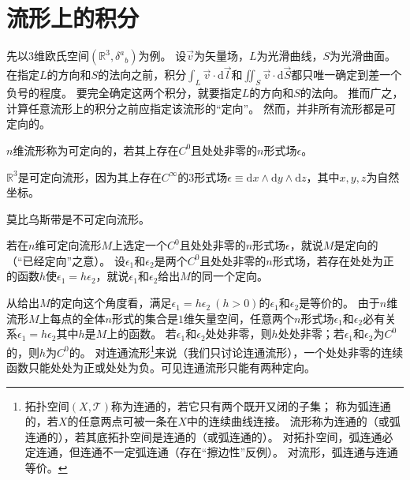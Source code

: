 \section{流形上的积分}

先以$3$维欧氏空间$(\mathbb{R}^3, \delta^a{}_{b})$为例。
设$\vec{v}$为矢量场，$L$为光滑曲线，$S$为光滑曲面。
在指定$L$的方向和$S$的法向之前，积分$\displaystyle\int_L\vec{v}\cdot\mathrm{d}\vec{l}$和$\displaystyle\iint_S\vec{v}\cdot\mathrm{d}\vec{S}$都只唯一确定到差一个负号的程度。
要完全确定这两个积分，就要指定$L$的方向和$S$的法向。
推而广之，计算任意流形上的积分之前应指定该流形的``定向''。
然而，并非所有流形都是可定向的。

\begin{definition}
    $n$维流形称为可定向的，若其上存在$C^0$且处处非零的$n$形式场$\epsilon$。
\end{definition}

\begin{example}
    $\mathbb{R}^3$是可定向流形，因为其上存在$C^\infty$的$3$形式场$\epsilon \equiv \mathrm{d}x \wedge \mathrm{d}y \wedge \mathrm{d}z$，其中$x, y, z$为自然坐标。
\end{example}

\begin{example}
    莫比乌斯带是不可定向流形。
\end{example}

\begin{definition}
    若在$n$维可定向流形$M$上选定一个$C^0$且处处非零的$n$形式场$\epsilon$，就说$M$是定向的（``已经定向''之意）。
    设$\epsilon_1$和$\epsilon_2$是两个$C^0$且处处非零的$n$形式场，若存在处处为正的函数$h$使$\epsilon_1 = h\epsilon_2$，就说$\epsilon_1$和$\epsilon_2$给出$M$的同一个定向。
\end{definition}

\begin{note}
    从给出$M$的定向这个角度看，满足$\epsilon_1 = h\epsilon_2 ~ (h > 0)$的$\epsilon_1$和$\epsilon_2$是等价的。
    由于$n$维流形$M$上每点的全体$n$形式的集合是$1$维矢量空间，任意两个$n$形式场$\epsilon_1$和$\epsilon_2$必有关系$\epsilon_1 = h\epsilon_2$其中$h$是$M$上的函数。
    若$\epsilon_1$和$\epsilon_2$处处非零，则$h$处处非零；若$\epsilon_1$和$\epsilon_2$为$C^0$的，则$h$为$C^0$的。
    对连通流形\footnote{
        拓扑空间$(X, \mathscr{T})$称为连通的，若它只有两个既开又闭的子集；
        称为弧连通的，若$X$的任意两点可被一条在$X$中的连续曲线连接。
        流形称为连通的（或弧连通的），若其底拓扑空间是连通的（或弧连通的）。
        对拓扑空间，弧连通必定连通，但连通不一定弧连通（存在``擦边性''反例）。
        对流形，弧连通与连通等价。
    }来说（我们只讨论连通流形），一个处处非零的连续函数只能处处为正或处处为负。可见连通流形只能有两种定向。
\end{note}

